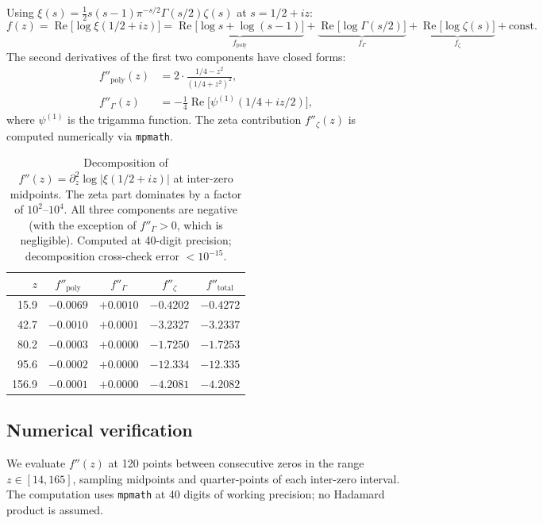 \documentclass[11pt,a4paper]{article}
\DeclareMathOperator{\re}{Re}
\begin{document}
Using $\xi(s) = \frac{1}{2}s(s-1)\pi^{-s/2}\Gamma(s/2)\zeta(s)$
at $s = 1/2 + iz$:
\begin{equation}\label{eq:decomp}
  f(z) = \re\bigl[\log\xi(1/2+iz)\bigr]
  = \underbrace{\re\bigl[\log s + \log(s{-}1)\bigr]}_{f_{\mathrm{poly}}}
  + \underbrace{\re\bigl[\log\Gamma(s/2)\bigr]}_{f_{\Gamma}}
  + \underbrace{\re\bigl[\log\zeta(s)\bigr]}_{f_{\zeta}}
  + \mathrm{const}.
\end{equation}
The second derivatives of the first two components have closed forms:
\begin{align}
  f''_{\mathrm{poly}}(z) &= 2\cdot\frac{1/4 - z^2}{(1/4 + z^2)^2},
    \label{eq:fpp-poly} \\
  f''_{\Gamma}(z) &= -\tfrac{1}{4}\re\bigl[\psi^{(1)}(1/4 + iz/2)\bigr],
    \label{eq:fpp-gamma}
\end{align}
where $\psi^{(1)}$ is the trigamma function. The zeta contribution
$f''_{\zeta}(z)$ is computed numerically via \texttt{mpmath}.

\begin{table}[t]
\centering
\begin{tabular}{@{}rcccc@{}}
\toprule
$z$ & $f''_{\mathrm{poly}}$ & $f''_{\Gamma}$ & $f''_{\zeta}$ & $f''_{\mathrm{total}}$ \\
\midrule
15.9 & $-0.0069$ & $+0.0010$ & $-0.4202$ & $-0.4272$ \\
42.7 & $-0.0010$ & $+0.0001$ & $-3.2327$ & $-3.2337$ \\
80.2 & $-0.0003$ & $+0.0000$ & $-1.7250$ & $-1.7253$ \\
95.6 & $-0.0002$ & $+0.0000$ & $-12.334$ & $-12.335$ \\
156.9 & $-0.0001$ & $+0.0000$ & $-4.2081$ & $-4.2082$ \\
\bottomrule
\end{tabular}
\caption{Decomposition of $f''(z) = \partial_z^2\log|\xi(1/2+iz)|$
  at inter-zero midpoints. The zeta part dominates by a factor of
  $10^2$--$10^4$. All three components are negative (with the
  exception of $f''_\Gamma > 0$, which is negligible). Computed at
  40-digit precision; decomposition cross-check error $< 10^{-15}$.}
\label{tab:logconcavity}
\end{table}

\subsection{Numerical verification}

We evaluate $f''(z)$ at 120 points between consecutive zeros in the
range $z \in [14, 165]$, sampling midpoints and quarter-points of
each inter-zero interval. The computation uses \texttt{mpmath} at 40
digits of working precision; no Hadamard product is assumed.
\end{document}
